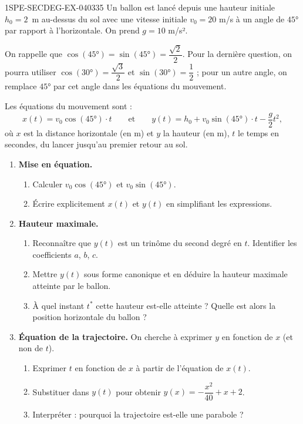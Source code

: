 \begin{exercice}{1SPE-SECDEG-EX-040}{3}{35}
Un ballon est lancé depuis une hauteur initiale $h_0 = 2$~m au-dessus du sol avec une vitesse initiale $v_0 = 20$ m/s à un angle de $45°$ par rapport à l'horizontale. On prend $g = 10$ m/s².

On rappelle que $\cos(45°) = \sin(45°) = \dfrac{\sqrt{2}}{2}$.
Pour la dernière question, on pourra utiliser $\cos(30°)=\dfrac{\sqrt{3}}{2}$
et $\sin(30°)=\dfrac{1}{2}$ ; pour un autre angle, on remplace $45°$ par cet
angle dans les équations du mouvement.

Les équations du mouvement sont :
\[
  x(t) = v_0 \cos(45°) \cdot t \qquad \text{et} \qquad y(t) = h_0 + v_0 \sin(45°) \cdot t - \frac{g}{2}t^2,
\]
où $x$ est la distance horizontale (en m) et $y$ la hauteur (en m), $t$ le temps
en secondes, du lancer jusqu'au premier retour au sol.

\begin{enumerate}
  \item \textbf{Mise en équation.}
  \begin{enumerate}
    \item Calculer $v_0 \cos(45°)$ et $v_0 \sin(45°)$.
    \item Écrire explicitement $x(t)$ et $y(t)$ en simplifiant les expressions.
  \end{enumerate}

  \item \textbf{Hauteur maximale.}
  \begin{enumerate}
    \item Reconnaître que $y(t)$ est un trinôme du second degré en $t$. Identifier les coefficients $a$, $b$, $c$.
    \item Mettre $y(t)$ sous forme canonique et en déduire la hauteur maximale atteinte par le ballon.
    \item À quel instant $t^*$ cette hauteur est-elle atteinte ? Quelle est alors la position horizontale du ballon ?
  \end{enumerate}

  \item \textbf{Équation de la trajectoire.} On cherche à exprimer $y$ en fonction de $x$ (et non de $t$).
  \begin{enumerate}
    \item Exprimer $t$ en fonction de $x$ à partir de l'équation de $x(t)$.
    \item Substituer dans $y(t)$ pour obtenir $y(x) = -\dfrac{x^2}{40} + x + 2$.
    \item Interpréter : pourquoi la trajectoire est-elle une parabole ?
  \end{enumerate}


\end{enumerate}
\end{exercice}
